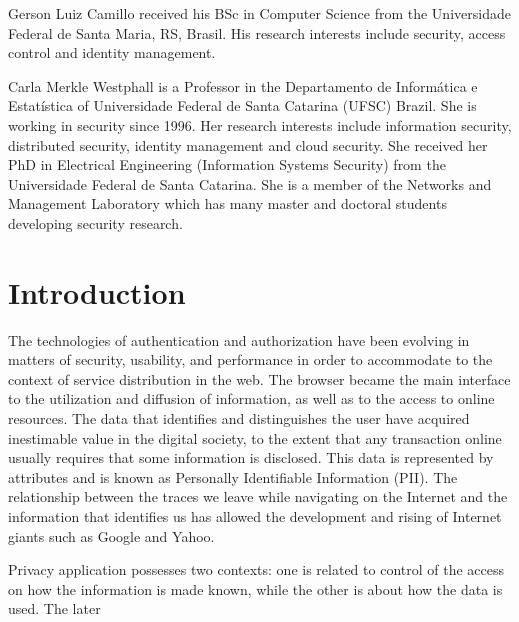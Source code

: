 \documentclass{doublecol-new}
\begin{document}
\begin{bio}
Gerson Luiz Camillo received his BSc in Computer Science from the Universidade Federal de Santa Maria, RS, Brasil. His research interests include security, access control and identity management.

\noindent Carla Merkle Westphall is a Professor in the Departamento de Informática e Estatística of Universidade Federal de Santa Catarina (UFSC) Brazil. She is working in security since 1996. Her research interests include information security, distributed security, identity management and cloud security. She received her PhD in Electrical Engineering (Information Systems Security) from the Universidade Federal de Santa Catarina. She is a member of the Networks and Management Laboratory which has many master and doctoral students developing security research.

\end{bio}

\maketitle

\section{Introduction}

The technologies of authentication and authorization have been evolving in matters of security, usability, and performance in order to accommodate to the context of service distribution in the web. The browser became the main interface to the utilization and diffusion of information, as well as to the access to online resources.
The data that identifies and distinguishes the user have acquired inestimable value in the digital society, to the extent that any transaction online usually requires that some information is disclosed. This data is represented by attributes and is known as Personally Identifiable Information (PII). The relationship between the traces we leave while navigating on the Internet and the information that identifies us has allowed the development and rising of Internet giants such as Google and Yahoo.

Privacy application possesses two contexts\citep{kagal2010access}: one is related to control of the access on how the information is made known, while the other is about how the data is used. The later
\end{document}
